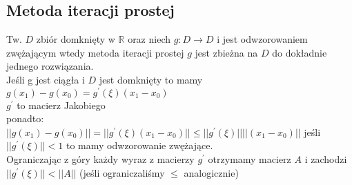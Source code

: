 \documentclass[twocolumn]{article}
\begin{document}
\begin{flushleft}
\section{Metoda iteracji prostej}
Tw. $D$ zbiór domknięty w $\mathbb{R}$ oraz niech $g:D\rightarrow D$ i jest odwzorowaniem zwężającym wtedy metoda iteracji prostej $g$ jest zbieżna na $D$ do dokładnie jednego rozwiązania.\\
Jeśli g jest ciągła i $D$ jest domknięty to mamy\\
$g(x_1) - g(x_0) = g^{\prime}(\xi)(x_1 - x_0)$\\
$g^{\prime}$ to macierz Jakobiego\\
ponadto:\\
$||g(x_1) - g(x_0)|| = ||g^{\prime}(\xi)(x_1 - x_0)|| \leq ||g^{\prime}(\xi)||||(x_1 - x_0)||$
jeśli $||g^{\prime}(\xi)|| < 1$ to mamy odwzorowanie zwężające.\\
Ograniczając z góry każdy wyraz z macierzy $g^{\prime}$ otrzymamy macierz $A$ i zachodzi $||g^{\prime}(\xi)|| < ||A||$ (jeśli ograniczaliśmy $\leq$ analogicznie)
\end{flushleft}
\thispagestyle{empty}
\end{document}
